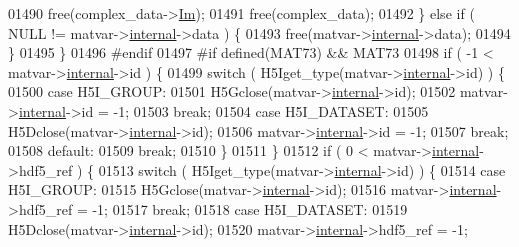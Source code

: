 \begin{DoxyCode}
{{{{{{{{{{{{{{{{{{{{{{{{{{{{{{01490                 free(complex\_data->\hyperlink{group___m_a_t_a7182d10b0d3598415887376065440946}{Im});
01491                 free(complex\_data);
01492             \} \textcolor{keywordflow}{else} \textcolor{keywordflow}{if} ( NULL != matvar->\hyperlink{group___m_a_t_a6e97e3ed9f40c49322c18561c2a94e92}{internal}->data ) \{
01493                 free(matvar->\hyperlink{group___m_a_t_a6e97e3ed9f40c49322c18561c2a94e92}{internal}->data);
01494             \}
01495         \}
01496 \textcolor{preprocessor}{#endif}
01497 \textcolor{preprocessor}{#if defined(MAT73) && MAT73}
01498         \textcolor{keywordflow}{if} ( -1 < matvar->\hyperlink{group___m_a_t_a6e97e3ed9f40c49322c18561c2a94e92}{internal}->id ) \{
01499             \textcolor{keywordflow}{switch} ( H5Iget\_type(matvar->\hyperlink{group___m_a_t_a6e97e3ed9f40c49322c18561c2a94e92}{internal}->id) ) \{
01500                 \textcolor{keywordflow}{case} H5I\_GROUP:
01501                     H5Gclose(matvar->\hyperlink{group___m_a_t_a6e97e3ed9f40c49322c18561c2a94e92}{internal}->id);
01502                     matvar->\hyperlink{group___m_a_t_a6e97e3ed9f40c49322c18561c2a94e92}{internal}->id = -1;
01503                     \textcolor{keywordflow}{break};
01504                 \textcolor{keywordflow}{case} H5I\_DATASET:
01505                     H5Dclose(matvar->\hyperlink{group___m_a_t_a6e97e3ed9f40c49322c18561c2a94e92}{internal}->id);
01506                     matvar->\hyperlink{group___m_a_t_a6e97e3ed9f40c49322c18561c2a94e92}{internal}->id = -1;
01507                     \textcolor{keywordflow}{break};
01508                 \textcolor{keywordflow}{default}:
01509                     \textcolor{keywordflow}{break};
01510             \}
01511         \}
01512         \textcolor{keywordflow}{if} ( 0 < matvar->\hyperlink{group___m_a_t_a6e97e3ed9f40c49322c18561c2a94e92}{internal}->hdf5\_ref ) \{
01513             \textcolor{keywordflow}{switch} ( H5Iget\_type(matvar->\hyperlink{group___m_a_t_a6e97e3ed9f40c49322c18561c2a94e92}{internal}->id) ) \{
01514                 \textcolor{keywordflow}{case} H5I\_GROUP:
01515                     H5Gclose(matvar->\hyperlink{group___m_a_t_a6e97e3ed9f40c49322c18561c2a94e92}{internal}->id);
01516                     matvar->\hyperlink{group___m_a_t_a6e97e3ed9f40c49322c18561c2a94e92}{internal}->hdf5\_ref = -1;
01517                     \textcolor{keywordflow}{break};
01518                 \textcolor{keywordflow}{case} H5I\_DATASET:
01519                     H5Dclose(matvar->\hyperlink{group___m_a_t_a6e97e3ed9f40c49322c18561c2a94e92}{internal}->id);
01520                     matvar->\hyperlink{group___m_a_t_a6e97e3ed9f40c49322c18561c2a94e92}{internal}->hdf5\_ref = -1;
}}}}}}}}}}}}}}}}}}}}}}}}}}}}}}
\end{DoxyCode}
